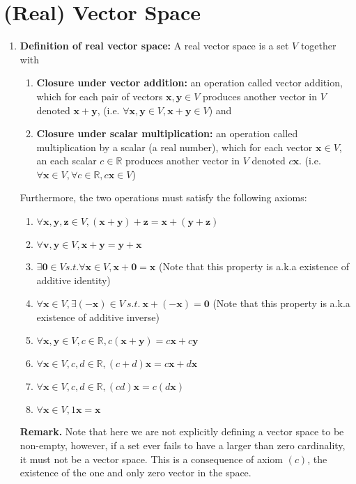 \documentclass[oneside, 12pt]{book}
\newcommand{\settag}[1]{\renewcommand{\theenumi}{#1}}
\newcommand{\tbf}[1]{\textbf{#1}}
\begin{document}
\section{(Real) Vector Space}
\begin{enumerate}
    \settag{1.1.1}
    \item{\textbf{Definition of real vector space:}} A real vector space is a set $V$ together with
    \begin{enumerate}
        \item \textbf{Closure under vector addition:} an operation called vector addition, which for each pair of vectors $\mathbf{x}, \mathbf{y}\in V$ produces another vector in $V$ denoted $\mathbf{x} + \mathbf{y}$, (i.e. $\forall \mathbf{x}, \mathbf{y}\in V, \mathbf{x} + \mathbf{y} \in V$) and
        \item \textbf{Closure under scalar multiplication:} an operation called multiplication by a scalar (a real number), which for each vector $\mathbf{x}\in V$, an each scalar $c\in \mathbb{R}$ produces another vector in $V$ denoted $c\mathbf{x}$. (i.e. $\forall \mathbf{x}\in V, \forall c \in \mathbb{R}, c \mathbf{x} \in V$)
    \end{enumerate}
    Furthermore, the two operations must satisfy the following axioms:
    \begin{enumerate}
        \item $\forall \mathbf{x}, \mathbf{y}, \mathbf{z} \in V, (\mathbf{x} + \mathbf{y}) + \mathbf{z} = \mathbf{x} + (\mathbf{y} + \mathbf{z})$
        \item $\forall \mathbf{v}, \mathbf{y} \in V, \mathbf{x} + \mathbf{y} = \mathbf{y} + \mathbf{x}$
        \item $\exists \mathbf{0} \in V s.t. \forall \mathbf{x} \in V, \mathbf{x} + \mathbf{0} = \mathbf{x}$ (Note that this property is a.k.a existence of additive identity)
        \item $\forall \mathbf{x} \in V, \exists (-\mathbf{x}) \in V~s.t.~\mathbf{x} + (-\mathbf{x}) = \mathbf{0}$ (Note that this property is a.k.a existence of additive inverse)
        \item $\forall \mathbf{x}, \mathbf{y} \in V, c \in \mathbb{R}, c(\mathbf{x} + \mathbf{y}) = c\mathbf{x} + c\mathbf{y}$
        \item $\forall \mathbf{x} \in V, c,d \in \mathbb{R}, (c + d)\mathbf{x} = c\mathbf{x} + d\mathbf{x}$
        \item $\forall \mathbf{x} \in V, c,d \in \mathbb{R}, (cd)\mathbf{x} = c(d\mathbf{x})$
        \item $\forall \mathbf{x} \in V, 1\mathbf{x} = \mathbf{x}$
    \end{enumerate}
    \tbf{Remark.} Note that here we are not explicitly defining a vector space to be non-empty, however, if a set ever fails to have a larger than zero cardinality, it must not be a vector space. This is a consequence of axiom $(c)$, the existence of the one and only zero vector in the space.
    

\end{enumerate}
\end{document}
